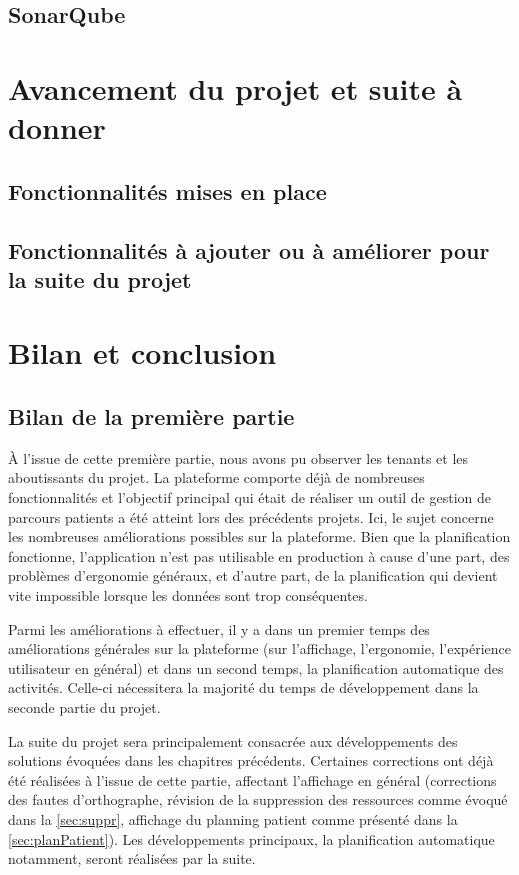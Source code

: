 \documentclass[noposter]{polytech/polytech}
\begin{document}
\section{SonarQube}



\chapter{Avancement du projet et suite à donner}


\section{Fonctionnalités mises en place}


\section{Fonctionnalités à ajouter ou à améliorer pour la suite du projet}



\chapter*{Bilan et conclusion}

\section*{Bilan de la première partie}

À l'issue de cette première partie, nous avons pu observer les tenants et les aboutissants du projet. La plateforme comporte déjà de nombreuses fonctionnalités et l'objectif principal qui était de réaliser un outil de gestion de parcours patients a été atteint lors des précédents projets. Ici, le sujet concerne les nombreuses améliorations possibles sur la plateforme. Bien que la planification fonctionne, l'application n'est pas utilisable en production à cause d'une part, des problèmes d'ergonomie généraux, et d'autre part, de la planification qui devient vite impossible lorsque les données sont trop conséquentes.

Parmi les améliorations à effectuer, il y a dans un premier temps des améliorations générales sur la plateforme (sur l'affichage, l'ergonomie, l'expérience utilisateur en général) et dans un second temps, la planification automatique des activités. Celle-ci nécessitera la majorité du temps de développement dans la seconde partie du projet.

La suite du projet sera principalement consacrée aux développements des solutions évoquées dans les chapitres précédents. Certaines corrections ont déjà été réalisées à l'issue de cette partie, affectant l'affichage en général (corrections des fautes d'orthographe, révision de la suppression des ressources comme évoqué dans la \autoref{sec:suppr}, affichage du planning patient comme présenté dans la \autoref{sec:planPatient}). Les développements principaux, la planification automatique notamment, seront réalisées par la suite. 
\end{document}
